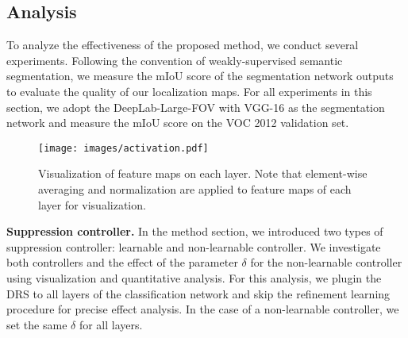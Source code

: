 \documentclass[letterpaper]{article} \usepackage{aaai21}  \usepackage{times}  \usepackage{helvet} \usepackage{courier}  \usepackage[hyphens]{url}  \usepackage{graphicx} \urlstyle{rm} \def\UrlFont{\rm}  \usepackage{natbib}  \usepackage{caption} \frenchspacing  \setlength{\pdfpagewidth}{8.5in}  \setlength{\pdfpageheight}{11in}
\begin{document}
\subsection{Analysis}
To analyze the effectiveness of the proposed method, we conduct several experiments.
Following the convention of weakly-supervised semantic segmentation, we measure the mIoU score of the segmentation network outputs to evaluate the quality of our localization maps.
For all experiments in this section, we adopt the DeepLab-Large-FOV with VGG-16 as the segmentation network and measure the mIoU score on the VOC 2012 validation set.



\begin{figure}[t]
    \centering
    \texttt{[image: images/activation.pdf]}
    \caption{
        Visualization of feature maps on each layer. Note that element-wise averaging and normalization are applied to feature maps of each layer for visualization. 
    }
    \label{figure:activation}
\end{figure}



\noindent\textbf{Suppression controller.} 
In the method section, we introduced two types of suppression controller: learnable and non-learnable controller.
We investigate both controllers and the effect of the parameter $\delta$ for the non-learnable controller using visualization and quantitative analysis. For this analysis, we plugin the DRS to all layers of the classification network and skip the refinement learning procedure for precise effect analysis.
In the case of a non-learnable controller, we set the same $\delta$ for all layers.
\end{document}
